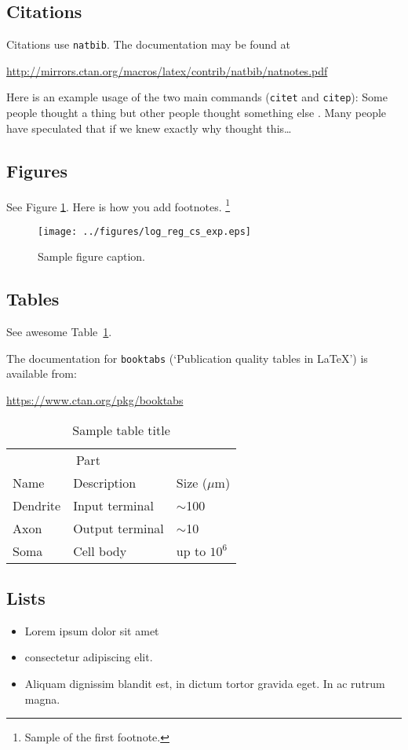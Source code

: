 \documentclass{article}
\begin{document}
\subsection{Citations}
Citations use \verb+natbib+. The documentation may be found at
\begin{center}
	\url{http://mirrors.ctan.org/macros/latex/contrib/natbib/natnotes.pdf}
\end{center}

Here is an example usage of the two main commands (\verb+citet+ and \verb+citep+): Some people thought a thing \citep{kour2014real, hadash2018estimate} but other people thought something else \citep{kour2014fast}. Many people have speculated that if we knew exactly why \citet{kour2014fast} thought this\dots

\subsection{Figures}
\lipsum[10]
See Figure \ref{fig:fig1}. Here is how you add footnotes. \footnote{Sample of the first footnote.}
\lipsum[11]

\begin{figure}
	\centering
	\texttt{[image: ../figures/log\_reg\_cs\_exp.eps]}
	\caption{Sample figure caption.}
	\label{fig:fig1}
\end{figure}

\subsection{Tables}
See awesome Table~\ref{tab:table}.

The documentation for \verb+booktabs+ (`Publication quality tables in LaTeX') is available from:
\begin{center}
	\url{https://www.ctan.org/pkg/booktabs}
\end{center}


\begin{table}
	\caption{Sample table title}
	\centering
	\begin{tabular}{lll}
		\toprule
		\multicolumn{2}{c}{Part}                   \\
		\cmidrule(r){1-2}
		Name     & Description     & Size ($\mu$m) \\
		\midrule
		Dendrite & Input terminal  & $\sim$100     \\
		Axon     & Output terminal & $\sim$10      \\
		Soma     & Cell body       & up to $10^6$  \\
		\bottomrule
	\end{tabular}
	\label{tab:table}
\end{table}

\subsection{Lists}
\begin{itemize}
	\item Lorem ipsum dolor sit amet
	\item consectetur adipiscing elit.
	\item Aliquam dignissim blandit est, in dictum tortor gravida eget. In ac rutrum magna.
\end{itemize}




\printbibliography
\end{document}
